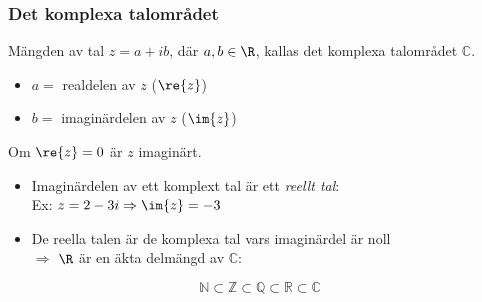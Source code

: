 \documentclass[slidestop,blue,handout,9pt]{beamer}
\begin{document}
\begin{frame}
\frametitle{Det komplexa talområdet}
\begin{definition}
Mängden av tal $z=a+ib$, där $a,b\in \R$, kallas 
\alert{det komplexa talområdet $\mathbb{C}$}. 
\begin{itemize}
\item $a = $ \alert{realdelen} av $z$ ($\re{z}$)
\item $b = $ \alert{imaginärdelen} av $z$ ($\im{z}$)
\end{itemize}
Om $\re{z} = 0$ är $z$ \alert{imaginärt}.
\end{definition}
\begin{anm}
\begin{itemize}
 \item Imaginärdelen av ett komplext tal är ett \emph{reellt tal}: \\
\onslide<+->
Ex: $z = 2 - 3i\Rightarrow \im{z} = -3$
\item De reella talen är de komplexa tal vars imaginärdel är noll \\
\onslide<+->
$\Rightarrow$
 $\R$ är en äkta delmängd av $\mathbb{C}$:
\end{itemize}
  \[
  \mathbb{N}\subset \mathbb{Z}\subset \mathbb{Q}\subset
  \mathbb{R}\subset \mathbb{C}
  \]
\end{anm}
\end{frame}
\end{document}
